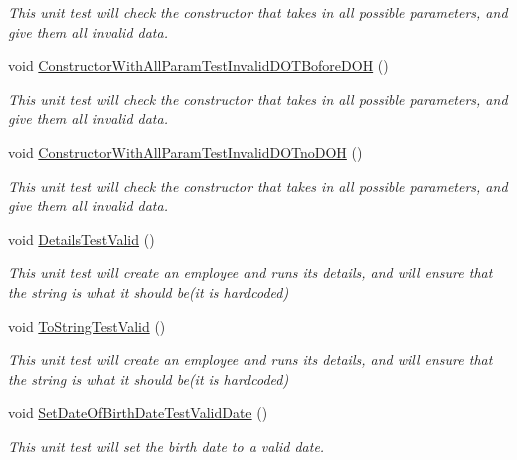 \begin{DoxyCompactItemize}
\begin{DoxyCompactList}\small\item\em This unit test will check the constructor that takes in all possible parameters, and give them all invalid data. \end{DoxyCompactList}\item 
void \hyperlink{class_my_all_employee_1_1_tests_1_1_full_time_employee_tests_af86e639c0ad8ddb950f32c10d0aef18b}{Constructor\+With\+All\+Param\+Test\+Invalid\+D\+O\+T\+Bofore\+D\+O\+H} ()
\begin{DoxyCompactList}\small\item\em This unit test will check the constructor that takes in all possible parameters, and give them all invalid data. \end{DoxyCompactList}\item 
void \hyperlink{class_my_all_employee_1_1_tests_1_1_full_time_employee_tests_ab76d68d6df376b1ec8694cba60b2ed96}{Constructor\+With\+All\+Param\+Test\+Invalid\+D\+O\+Tno\+D\+O\+H} ()
\begin{DoxyCompactList}\small\item\em This unit test will check the constructor that takes in all possible parameters, and give them all invalid data. \end{DoxyCompactList}\item 
void \hyperlink{class_my_all_employee_1_1_tests_1_1_full_time_employee_tests_a59450e7f9d9a9dd87710623acd826566}{Details\+Test\+Valid} ()
\begin{DoxyCompactList}\small\item\em This unit test will create an employee and runs it\textquotesingle{}s details, and will ensure that the string is what it should be(it is hardcoded) \end{DoxyCompactList}\item 
void \hyperlink{class_my_all_employee_1_1_tests_1_1_full_time_employee_tests_a06a5cef67c7ba190e9dc07902aaf4f76}{To\+String\+Test\+Valid} ()
\begin{DoxyCompactList}\small\item\em This unit test will create an employee and runs it\textquotesingle{}s details, and will ensure that the string is what it should be(it is hardcoded) \end{DoxyCompactList}\item 
void \hyperlink{class_my_all_employee_1_1_tests_1_1_full_time_employee_tests_a608fd7d42e10fb6da5f03150b3f4a96b}{Set\+Date\+Of\+Birth\+Date\+Test\+Valid\+Date} ()
\begin{DoxyCompactList}\small\item\em This unit test will set the birth date to a valid date. \end{DoxyCompactList}\item 

\end{DoxyCompactItemize}
